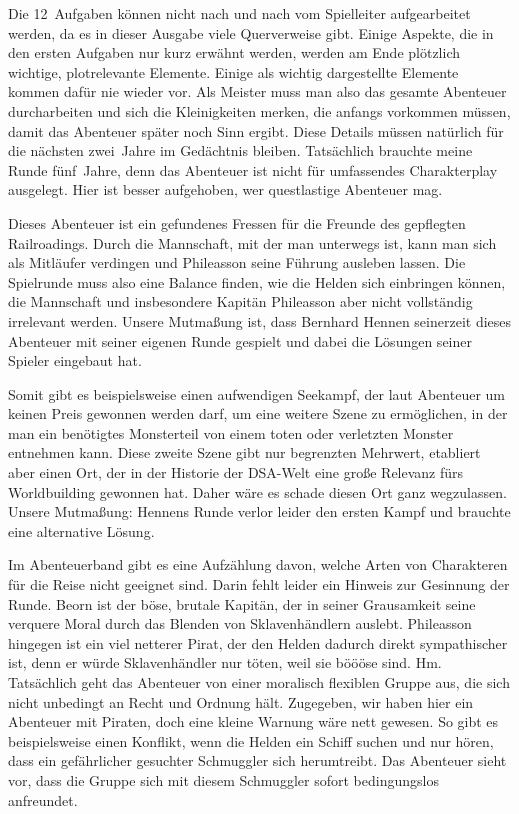 \documentclass[final]{multiversum}
\begin{document}
Die 12~Aufgaben können nicht nach und nach vom Spielleiter aufgearbeitet werden,
da es in dieser Ausgabe viele Querverweise gibt. Einige Aspekte, die in den
ersten Aufgaben nur kurz erwähnt werden, werden am Ende plötzlich wichtige,
plotrelevante Elemente. Einige als wichtig dargestellte Elemente kommen dafür
nie wieder vor. Als Meister muss man also das gesamte Abenteuer durcharbeiten
und sich die Kleinigkeiten merken, die anfangs vorkommen müssen, damit das
Abenteuer später noch Sinn ergibt. Diese Details müssen natürlich für die
nächsten zwei~Jahre im Gedächtnis bleiben. Tatsächlich brauchte meine Runde
fünf~Jahre, denn das Abenteuer ist nicht für umfassendes Charakterplay
ausgelegt. Hier ist besser aufgehoben, wer questlastige Abenteuer mag.

Dieses Abenteuer ist ein gefundenes Fressen für die Freunde des gepflegten
Railroadings. Durch die Mannschaft, mit der man unterwegs ist, kann man sich als
Mitläufer verdingen und Phileasson seine Führung ausleben lassen. Die Spielrunde
muss also eine Balance finden, wie die Helden sich einbringen können, die
Mannschaft und insbesondere Kapitän Phileasson aber nicht vollständig irrelevant
werden. Unsere Mutmaßung ist, dass Bernhard Hennen seinerzeit dieses
Abenteuer mit seiner eigenen Runde gespielt und dabei die Lösungen seiner
Spieler eingebaut hat.

Somit gibt es beispielsweise einen aufwendigen Seekampf, der laut Abenteuer um
keinen Preis gewonnen werden darf, um eine weitere Szene zu ermöglichen, in der
man ein benötigtes Monsterteil von einem toten oder verletzten Monster entnehmen
kann. Diese zweite Szene gibt nur begrenzten Mehrwert, etabliert aber einen Ort,
der in der Historie der DSA-Welt eine große Relevanz fürs Worldbuilding gewonnen
hat. Daher wäre es schade diesen Ort ganz wegzulassen. Unsere Mutmaßung:
Hennens Runde verlor leider den ersten Kampf und brauchte eine
alternative Lösung.

Im Abenteuerband gibt es eine Aufzählung davon, welche Arten von Charakteren für
die Reise nicht geeignet sind. Darin fehlt leider ein Hinweis zur Gesinnung der
Runde. Beorn ist der böse, brutale Kapitän, der in seiner Grausamkeit seine
verquere Moral durch das Blenden von Sklavenhändlern auslebt. Phileasson
hingegen ist ein viel netterer Pirat, der den Helden dadurch direkt
sympathischer ist, denn er würde Sklavenhändler nur töten, weil sie böööse sind.
Hm. Tatsächlich geht das Abenteuer von einer moralisch flexiblen Gruppe aus, die
sich nicht unbedingt an Recht und Ordnung hält. Zugegeben, wir haben hier ein
Abenteuer mit Piraten, doch eine kleine Warnung wäre nett gewesen. So gibt es
beispielsweise einen Konflikt, wenn die Helden ein Schiff suchen und nur hören,
dass ein gefährlicher gesuchter Schmuggler sich herumtreibt. Das Abenteuer sieht
vor, dass die Gruppe sich mit diesem Schmuggler sofort bedingungslos anfreundet.
\end{document}
